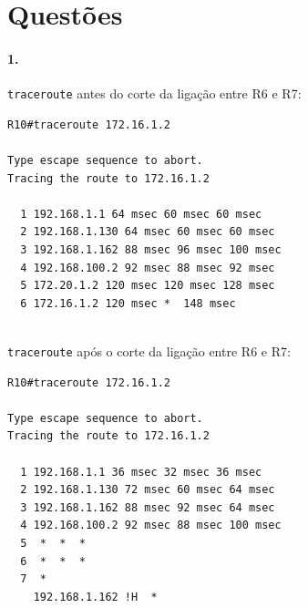 \section*{Questões}
\paragraph{1.}
\texttt{traceroute} antes do corte da ligação entre \textsf{R6} e \textsf{R7}:
\begin{verbatim}
R10#traceroute 172.16.1.2

Type escape sequence to abort.
Tracing the route to 172.16.1.2

  1 192.168.1.1 64 msec 60 msec 60 msec
  2 192.168.1.130 64 msec 60 msec 60 msec
  3 192.168.1.162 88 msec 96 msec 100 msec
  4 192.168.100.2 92 msec 88 msec 92 msec
  5 172.20.1.2 120 msec 120 msec 128 msec
  6 172.16.1.2 120 msec *  148 msec
\end{verbatim}\\
\texttt{traceroute} após o corte da ligação entre \textsf{R6} e \textsf{R7}:
\begin{verbatim}
R10#traceroute 172.16.1.2

Type escape sequence to abort.
Tracing the route to 172.16.1.2

  1 192.168.1.1 36 msec 32 msec 36 msec
  2 192.168.1.130 72 msec 60 msec 64 msec
  3 192.168.1.162 88 msec 92 msec 64 msec
  4 192.168.100.2 92 msec 88 msec 100 msec
  5  *  *  * 
  6  *  *  * 
  7  * 
    192.168.1.162 !H  * 
\end{verbatim}

